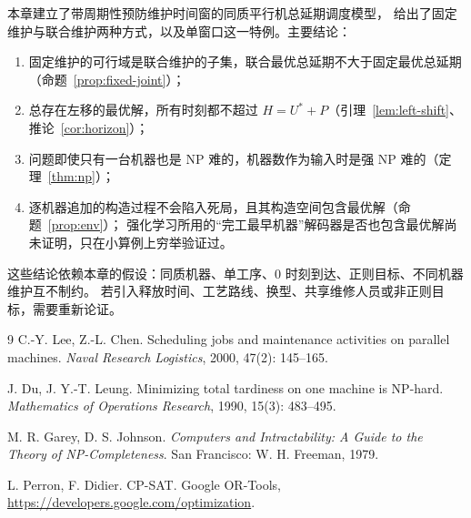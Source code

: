 \documentclass[11pt,oneside,notitlepage]{ctexrep}
\theoremstyle{definition}
\theoremstyle{remark}
\newcommand{\Ustar}{U^{*}}
\begin{document}
本章建立了带周期性预防维护时间窗的同质平行机总延期调度模型，
给出了固定维护与联合维护两种方式，以及单窗口这一特例。主要结论：
\begin{enumerate}[nosep]
  \item 固定维护的可行域是联合维护的子集，联合最优总延期不大于固定最优总延期（命题~\ref{prop:fixed-joint}）；
  \item 总存在左移的最优解，所有时刻都不超过 $H=\Ustar+P$（引理~\ref{lem:left-shift}、推论~\ref{cor:horizon}）；
  \item 问题即使只有一台机器也是 NP 难的，机器数作为输入时是强 NP 难的（定理~\ref{thm:np}）；
  \item 逐机器追加的构造过程不会陷入死局，且其构造空间包含最优解（命题~\ref{prop:env}）；
        强化学习所用的“完工最早机器”解码器是否也包含最优解尚未证明，只在小算例上穷举验证过。
\end{enumerate}
这些结论依赖本章的假设：同质机器、单工序、0 时刻到达、正则目标、不同机器维护互不制约。
若引入释放时间、工艺路线、换型、共享维修人员或非正则目标，需要重新论证。

\begin{thebibliography}{9}
C.-Y. Lee, Z.-L. Chen. Scheduling jobs and maintenance activities on parallel machines.
\emph{Naval Research Logistics}, 2000, 47(2): 145--165.

J. Du, J. Y.-T. Leung. Minimizing total tardiness on one machine is NP-hard.
\emph{Mathematics of Operations Research}, 1990, 15(3): 483--495.

M. R. Garey, D. S. Johnson. \emph{Computers and Intractability: A Guide to the Theory of NP-Completeness}.
San Francisco: W. H. Freeman, 1979.

L. Perron, F. Didier. CP-SAT. Google OR-Tools, \url{https://developers.google.com/optimization}.
\end{thebibliography}
\end{document}
